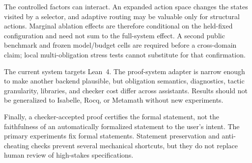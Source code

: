 The controlled factors can interact. An expanded action space changes the
states visited by a selector, and adaptive routing may be valuable only for
structural actions. Marginal ablation effects are therefore conditional on the
held-fixed configuration and need not sum to the full-system effect. A second
public benchmark and frozen model/budget cells are required before a
cross-domain claim; local multi-obligation stress tests cannot substitute for
that confirmation.

The current system targets Lean~4. The proof-system adapter is narrow enough to
make another backend plausible, but obligation semantics, diagnostics, tactic
granularity, libraries, and checker cost differ across assistants. Results
should not be generalized to Isabelle, Rocq, or Metamath without new
experiments.

Finally, a checker-accepted proof certifies the formal statement, not the
faithfulness of an automatically formalized statement to the user's intent.
The primary experiments fix formal statements. Statement preservation and
anti-cheating checks prevent several mechanical shortcuts, but they do not
replace human review of high-stakes specifications.
